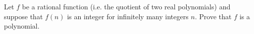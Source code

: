 Let \(f\) be a rational function (i.e. the quotient of two real polynomials) and suppose that \(f(n)\) is an integer for infinitely many integers \(n\). Prove that \(f\) is a polynomial.